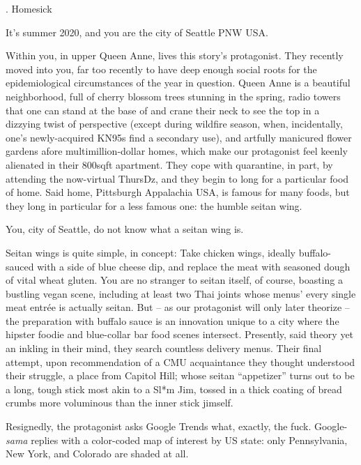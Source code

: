 \documentclass[12pt]{article}
\newcommand\chapter[2]{{\thispagestyle{empty} \Large \sc #1. \quad #2

\vspace{1.5em}}}
\begin{document}
\chapter{1}{Homesick}

It's summer 2020, and you are the city of Seattle PNW USA.

Within you, in upper Queen Anne, lives this story's protagonist.
They recently moved into you, far too recently to have deep enough social roots for the epidemiological circumstances of the year in question.
Queen Anne is a beautiful neighborhood,
full of cherry blossom trees stunning in the spring,
radio towers that one can stand at the base of and crane their neck to see the top in a dizzying twist of perspective
(except during wildfire season, when, incidentally, one's newly-acquired KN95s find a secondary use),
and artfully manicured flower gardens afore multimillion-dollar homes,
which make our protagonist feel keenly alienated in their 800sqft apartment.
They cope with quarantine, in part, by attending the now-virtual ThursDz,
and they begin to long for a particular food of home.
%
Said home, Pittsburgh Appalachia USA, is famous for many foods,
but they long in particular for a less famous one: the humble seitan wing.

You, city of Seattle, do not know what a seitan wing is.

Seitan wings is quite simple, in concept: Take chicken wings, ideally buffalo-sauced with a side of blue cheese dip, and replace the meat with seasoned dough of vital wheat gluten.
You are no stranger to seitan itself, of course, boasting a bustling vegan scene, including at least two Thai joints whose menus' every single meat entr\'ee is actually seitan.
But -- as our protagonist will only later theorize -- the preparation with buffalo sauce is an innovation unique to a city where the hipster foodie and blue-collar bar food scenes intersect.
Presently, said theory yet an inkling in their mind, they search countless delivery menus.
Their final attempt, upon recommendation of a CMU acquaintance they thought understood their struggle, a place from Capitol Hill;
whose seitan ``appetizer'' turns out to be a long, tough stick most akin to a Sl*m Jim, tossed in a thick coating of bread crumbs more voluminous than the inner stick jimself.

Resignedly, the protagonist asks Google Trends what, exactly, the fuck. Google-{\em sama} replies with a color-coded map of interest by US state: only Pennsylvania, New York, and Colorado are shaded at all.
\end{document}
